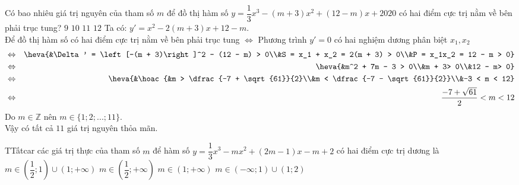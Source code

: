 \begin{ex}%
	Có bao nhiêu giá trị nguyên của tham số $m$ để đồ thị hàm số $y = \dfrac{1}{3}x^3 - (m +3)x^2 + (12 - m)x  + 2020$ có hai điểm cực trị nằm về bên phải trục tung?
	\choice 
		{$9$} 
		 {$10$}
		{\True  $11$}
		 {$12$}
		Ta  có: $y' = x^2 - 2(m + 3)x + 12 - m$.\\
		Để đồ thị hàm số có hai điểm cực trị nằm về bên phải trục tung $\Leftrightarrow$ Phương trình $y' =  0$ có hai nghiệm dương phân biệt $x_1,x_2$
		\begin{eqnarray*}
			&\Leftrightarrow& \heva{&\Delta' = \left[-(m + 3)\right]^2 - (12 - m) > 0\\&S = x_1 + x_2 = 2(m + 3)  > 0\\&P = x_1x_2 = 12 - m > 0}\\
			&\Leftrightarrow& \heva{&m^2 + 7m - 3  > 0\\&m + 3> 0\\&12 - m> 0}\\
			&\Leftrightarrow& \heva{&\hoac{&m > \dfrac{-7  + \sqrt{61}}{2}\\&m < \dfrac{-7 - \sqrt{61}}{2}}\\&-3 < m < 12}\\
			&\Leftrightarrow& \dfrac{-7 + \sqrt{61}}{2}<  m < 12
	\end{eqnarray*}
	 Do $m \in \mathbb{Z}$ nên $m \in \{1;2;...;11\}$.\\
	Vậy có tất cả $11$ giá trị nguyên thỏa  mãn.
\end{ex}

\begin{ex}%
	TTấtcar các giá  trị thực của tham số $m$ để hàm số $y= \dfrac{1}{3}x^3 - mx^2 + (2m - 1)x - m + 2$ có hai điểm cực trị dương là
	\choice 
		{\True $m \in \left(\dfrac{1}{2};1\right) \cup  (1;+ \infty)$}
		{$m \in (\dfrac{1}{2};+  \infty)$}
		{$m \in (1;+ \infty)$} 
		 {$m \in (- \infty; 1) \cup (1;2)$}
\end{ex}

